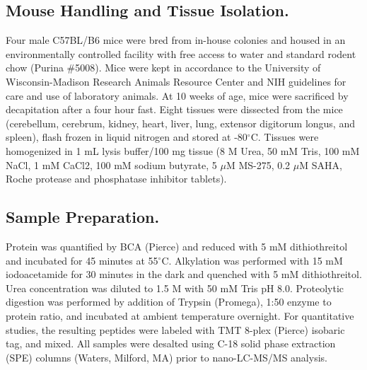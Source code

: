 \subsection*{Mouse Handling and Tissue Isolation.}
Four male C57BL/B6 mice were bred from in-house colonies and housed in an environmentally controlled facility with free access to water and standard rodent chow (Purina \#5008). Mice were kept in accordance to the University of Wisconsin-Madison Research Animals Resource Center and NIH guidelines for care and use of laboratory animals. At 10 weeks of age, mice were sacrificed by decapitation after a four hour fast. Eight tissues were dissected from the mice (cerebellum, cerebrum, kidney, heart, liver, lung, extensor digitorum longus, and spleen), flash frozen in liquid nitrogen and stored at -80$^\circ$C. Tissues were homogenized in 1 mL lysis buffer/100 mg tissue (8 M Urea, 50 mM Tris, 100 mM NaCl, 1 mM CaCl2, 100 mM sodium butyrate, 5 $\mu$M MS-275, 0.2 $\mu$M SAHA, Roche protease and phosphatase inhibitor tablets).

\subsection*{Sample Preparation.}
Protein was quantified by BCA (Pierce) and reduced with 5 mM dithiothreitol and incubated for 45 minutes at 55$^\circ$C. Alkylation was performed with 15 mM iodoacetamide for 30 minutes in the dark and quenched with 5 mM dithiothreitol. Urea concentration was diluted to 1.5 M with 50 mM Tris pH 8.0. Proteolytic digestion was performed by addition of Trypsin (Promega), 1:50 enzyme to protein ratio, and incubated at ambient temperature overnight. For quantitative studies, the resulting peptides were labeled with TMT 8-plex (Pierce) isobaric tag, and mixed.\cite{tmt8,tmt82} All samples were desalted using C-18 solid phase extraction (SPE) columns (Waters, Milford, MA) prior to nano-LC-MS/MS analysis.

